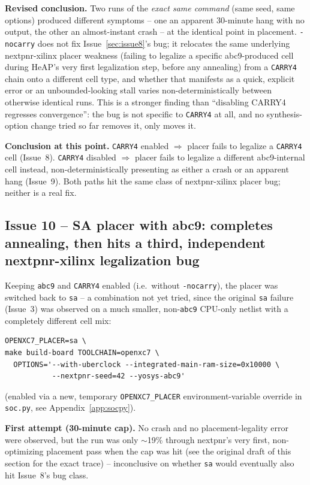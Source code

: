 \documentclass[11pt]{article}
\begin{document}
\textbf{Revised conclusion.} Two runs of the \emph{exact same command}
(same seed, same options) produced different symptoms -- one an
apparent 30-minute hang with no output, the other an almost-instant
crash -- at the identical point in placement. \lstinline{-nocarry} does
not fix Issue~\ref{sec:issue8}'s bug; it relocates the same underlying
nextpnr-xilinx placer weakness (failing to legalize a specific
abc9-produced cell during HeAP's very first legalization step, before
any annealing) from a \lstinline{CARRY4} chain onto a different cell
type, and whether that manifests as a quick, explicit error or an
unbounded-looking stall varies non-deterministically between otherwise
identical runs. This is a stronger finding than ``disabling CARRY4
regresses convergence'': the bug is not specific to \lstinline{CARRY4}
at all, and no synthesis-option change tried so far removes it, only
moves it.

\textbf{Conclusion at this point.} \lstinline{CARRY4} enabled
$\Rightarrow$ placer fails to legalize a \lstinline{CARRY4} cell
(Issue~8). \lstinline{CARRY4} disabled $\Rightarrow$ placer fails to
legalize a different abc9-internal cell instead, non-deterministically
presenting as either a crash or an apparent hang (Issue~9). Both paths
hit the same class of nextpnr-xilinx placer bug; neither is a real fix.

\subsection{Issue 10 -- SA placer with abc9: completes annealing, then
hits a third, independent nextpnr-xilinx legalization bug}
\label{sec:issue10}

Keeping \lstinline{abc9} and \lstinline{CARRY4} enabled (i.e.\ without
\lstinline{-nocarry}), the placer was switched back to \lstinline{sa} --
a combination not yet tried, since the original \lstinline{sa} failure
(Issue~3) was observed on a much smaller, non-\lstinline{abc9} CPU-only
netlist with a completely different cell mix:
\begin{lstlisting}[style=termout]
OPENXC7_PLACER=sa \
make build-board TOOLCHAIN=openxc7 \
  OPTIONS='--with-uberclock --integrated-main-ram-size=0x10000 \
           --nextpnr-seed=42 --yosys-abc9'
\end{lstlisting}
(enabled via a new, temporary \lstinline{OPENXC7_PLACER} environment-variable
override in \lstinline{soc.py}, see Appendix~\ref{app:socpy}).

\textbf{First attempt (30-minute cap).} No crash and no placement-legality
error were observed, but the run was only $\sim$19\% through nextpnr's
very first, non-optimizing placement pass when the cap was hit (see the
original draft of this section for the exact trace) -- inconclusive on
whether \lstinline{sa} would eventually also hit Issue~8's bug class.
\end{document}
